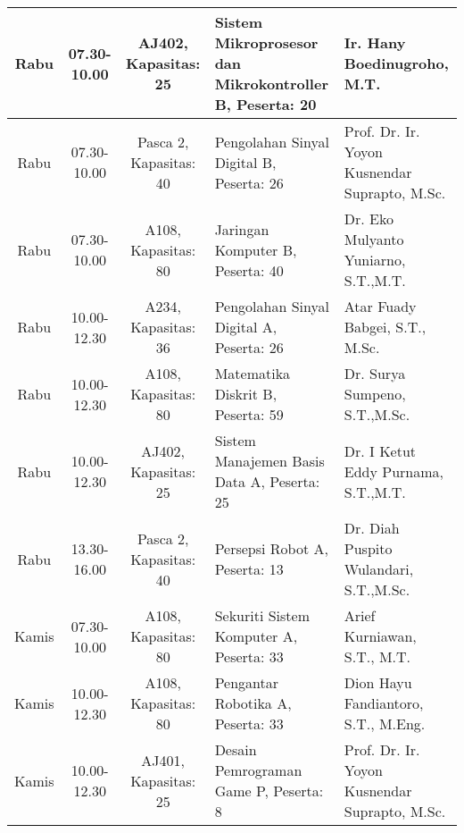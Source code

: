 \begin{longtable}[c]{|c|c|c|>{\centering\arraybackslash}m{3cm}|>{\centering\arraybackslash}m{3cm}|}
  Rabu   & 07.30-10.00 & AJ402, Kapasitas: 25   & Sistem Mikroprosesor dan Mikrokontroller B, \linebreak Peserta: 20  & Ir. Hany Boedinugroho, M.T.                   \\ \hline
  \rowcolor[HTML]{DAE8FC} 
  Rabu   & 07.30-10.00 & Pasca 2, Kapasitas: 40 & Pengolahan Sinyal Digital B, \linebreak Peserta: 26                 & Prof. Dr. Ir. Yoyon Kusnendar Suprapto, M.Sc. \\ \hline
  \rowcolor[HTML]{DAE8FC} 
  Rabu   & 07.30-10.00 & A108, Kapasitas: 80    & Jaringan Komputer B, \linebreak Peserta: 40                         & Dr. Eko Mulyanto Yuniarno, S.T.,M.T.          \\ \hline
  \rowcolor[HTML]{DAE8FC} 
  Rabu   & 10.00-12.30 & A234, Kapasitas: 36    & Pengolahan Sinyal Digital A, \linebreak Peserta: 26                 & Atar Fuady Babgei, S.T., M.Sc.                \\ \hline
  \rowcolor[HTML]{DAE8FC} 
  Rabu   & 10.00-12.30 & A108, Kapasitas: 80    & Matematika Diskrit B, \linebreak Peserta: 59                        & Dr. Surya Sumpeno, S.T.,M.Sc.                 \\ \hline
  \rowcolor[HTML]{DAE8FC} 
  Rabu   & 10.00-12.30 & AJ402, Kapasitas: 25   & Sistem Manajemen Basis Data A, \linebreak Peserta: 25               & Dr. I Ketut Eddy Purnama, S.T.,M.T.           \\ \hline
  \rowcolor[HTML]{DAE8FC} 
  Rabu   & 13.30-16.00 & Pasca 2, Kapasitas: 40 & Persepsi Robot A, \linebreak Peserta: 13                            & Dr. Diah Puspito Wulandari, S.T.,M.Sc.        \\ \hline
  Kamis  & 07.30-10.00 & A108, Kapasitas: 80    & Sekuriti Sistem Komputer A, \linebreak Peserta: 33                  & Arief Kurniawan, S.T., M.T.                   \\ \hline
  Kamis  & 10.00-12.30 & A108, Kapasitas: 80    & Pengantar Robotika A, \linebreak Peserta: 33                        & Dion Hayu Fandiantoro, S.T., M.Eng.           \\ \hline
  Kamis  & 10.00-12.30 & AJ401, Kapasitas: 25   & Desain Pemrograman Game P, \linebreak Peserta: 8                    & Prof. Dr. Ir. Yoyon Kusnendar Suprapto, M.Sc. \\ \hline

\end{longtable}
